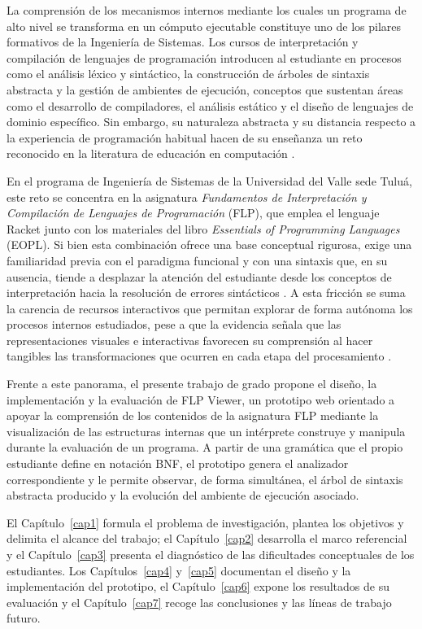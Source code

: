 La comprensión de los mecanismos internos mediante los cuales un programa de alto nivel se transforma en un cómputo ejecutable constituye uno de los pilares formativos de la Ingeniería de Sistemas. Los cursos de interpretación y compilación de lenguajes de programación introducen al estudiante en procesos como el análisis léxico y sintáctico, la construcción de árboles de sintaxis abstracta y la gestión de ambientes de ejecución, conceptos que sustentan áreas como el desarrollo de compiladores, el análisis estático y el diseño de lenguajes de dominio específico. Sin embargo, su naturaleza abstracta y su distancia respecto a la experiencia de programación habitual hacen de su enseñanza un reto reconocido en la literatura de educación en computación \cite{liu2017evaluation,navas2022modular}.

En el programa de Ingeniería de Sistemas de la Universidad del Valle sede Tuluá, este reto se concentra en la asignatura \textit{Fundamentos de Interpretación y Compilación de Lenguajes de Programación} (FLP), que emplea el lenguaje Racket junto con los materiales del libro \textit{Essentials of Programming Languages} (EOPL). Si bien esta combinación ofrece una base conceptual rigurosa, exige una familiaridad previa con el paradigma funcional y con una sintaxis que, en su ausencia, tiende a desplazar la atención del estudiante desde los conceptos de interpretación hacia la resolución de errores sintácticos \cite{Spigariol2023Aprendiendo}. A esta fricción se suma la carencia de recursos interactivos que permitan explorar de forma autónoma los procesos internos estudiados, pese a que la evidencia señala que las representaciones visuales e interactivas favorecen su comprensión al hacer tangibles las transformaciones que ocurren en cada etapa del procesamiento \cite{jovanovic2021comvis,lu2022usability,Stamenkovic2024AWE}.

Frente a este panorama, el presente trabajo de grado propone el diseño, la implementación y la evaluación de FLP Viewer, un prototipo web orientado a apoyar la comprensión de los contenidos de la asignatura FLP mediante la visualización de las estructuras internas que un intérprete construye y manipula durante la evaluación de un programa. A partir de una gramática que el propio estudiante define en notación BNF, el prototipo genera el analizador correspondiente y le permite observar, de forma simultánea, el árbol de sintaxis abstracta producido y la evolución del ambiente de ejecución asociado.

El Capítulo~\ref{cap1} formula el problema de investigación, plantea los objetivos y delimita el alcance del trabajo; el Capítulo~\ref{cap2} desarrolla el marco referencial y el Capítulo~\ref{cap3} presenta el diagnóstico de las dificultades conceptuales de los estudiantes. Los Capítulos~\ref{cap4} y~\ref{cap5} documentan el diseño y la implementación del prototipo, el Capítulo~\ref{cap6} expone los resultados de su evaluación y el Capítulo~\ref{cap7} recoge las conclusiones y las líneas de trabajo futuro.
